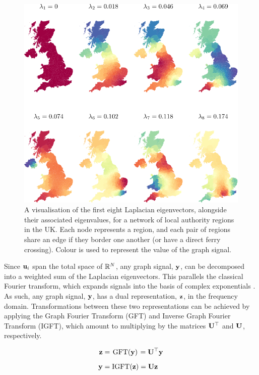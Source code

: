 \begin{figure}[t]
	\centering
		\includegraphics[width=0.85\linewidth]{Figures/uk_plot.pdf}
        \caption[A visualisation of the Laplacian eigenvectors for a network of regions in the UK]{A visualisation of the first eight Laplacian eigenvectors, alongside their associated eigenvalues, for a network of local authority regions in the UK. Each node represents a region, and each pair of regions share an edge if they border one another (or have a direct ferry crossing). Colour is used to represent the value of the graph signal.  }
	\label{fig:uk_eigs}
\end{figure}


Since ${\mathbf{u}_i}$ span the total space of $\mathbb{R}^N$, any graph signal, $\mathbf{y}$, can be decomposed into a weighted sum of the Laplacian eigenvectors. This parallels the classical Fourier transform, which expands signals into the basis of complex exponentials \citep{Sneddon1995}. As such, any graph signal, $\mathbf{y}$, has a dual representation, $\mathbf{z}$, in the frequency domain. Transformations between these two representations can be achieved by applying the Graph Fourier Transform (GFT) and Inverse Graph Fourier Transform (IGFT), which amount to multiplying by the matrices $\mathbf{U}^\top$ and $\mathbf{U}$, respectively.

\begin{align}
    \mathbf{z} &= \mkern 2mu \text{GFT}(\mathbf{y}) \mkern 2mu = \mathbf{U}^\top \mathbf{y} \\[0.2cm]
    \mathbf{y} &= \text{IGFT}(\mathbf{z})  = \mathbf{U} \mathbf{z}
\end{align}

